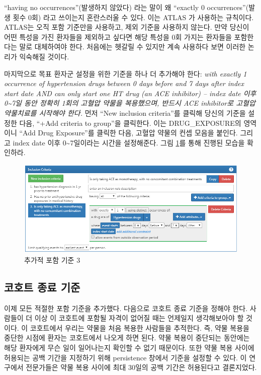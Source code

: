 \documentclass[11pt]{book}
\theoremstyle{definition}
\theoremstyle{definition}
\theoremstyle{definition}
\theoremstyle{remark}
\begin{document}
``having no occurrences''(발생하지 않았다) 라는 말이 왜 ``exactly 0
occurrences''(발생 횟수 0회) 라고 쓰이는지 혼란스러울 수 있다. 이는
ATLAS 가 사용하는 규칙이다. ATLAS는 오직 포함 기준만을 사용하고, 제외
기준을 사용하지 않는다. 만약 당신이 어떤 특성을 가진 환자들을 제외하고
싶다면 해당 특성을 0회 가지는 환자들을 포함한다는 말로 대체하여야 한다.
처음에는 헷갈릴 수 있지만 계속 사용하다 보면 이러한 논리가 익숙해질
것이다.

마지막으로 목표 환자군 설정을 위한 기준을 하나 더 추가해야 한다:
\emph{with exactly 1 occurrence of hypertension drugs between 0 days
before and 7 days after index start date AND can only start one HT drug
(an ACE inhibitor) -- index date 이후 0\textasciitilde{}7일 동안 정확히
1회의 고혈압 약물을 복용했으며, 반드시 ACE inhibitor로 고혈압 약물치료를
시작해야 한다.} 먼저 ``New inclusion criteria''를 클릭해 당신의 기준을
설정한 다음, ``+Add criteria to group''을 클릭한다. 이는
DRUG\_EXPOSURE의 영역이니 ``Add Drug Exposure''를 클릭한 다음, 고혈압
약물의 컨셉 모음을 붙인다. 그리고 index date 이후
0\textasciitilde{}7일이라는 시간을 설정해준다. 그림 \ref{fig:ATLASIC3}를
통해 진행된 모습을 확인하라.

\begin{figure}

{\centering \includegraphics[width=1\linewidth]{images/Cohorts/ATLAS-IC3} 

}

\caption{추가적 포함 기준 3}\label{fig:ATLASIC3}
\end{figure}

\subsection{코호트 종료 기준}\label{--}

이제 모든 적절한 포함 기준을 추가했다. 다음으로 코호트 종료 기준을
정해야 한다. 사람들이 더 이상 이 코호트에 포함될 자격이 없어질 때는
언제일지 생각해보아야 할 것이다. 이 코호트에서 우리는 약물을 처음 복용한
사람들을 추적한다. 즉, 약물 복용을 중단한 시점에 환자는 코호트에서
나오게 하면 된다. 약물 복용이 중단되는 동안에는 해당 환자에게 무슨 일이
일어나는지 확인할 수 없기 때문이다. 또한 약물 복용 사이에 허용되는 공백
기간을 지정하기 위해 persistence 창에서 기준을 설정할 수 있다. 이
연구에서 전문가들은 약물 복용 사이에 최대 30일의 공백 기간은 허용된다고
결론지었다.
\end{document}
